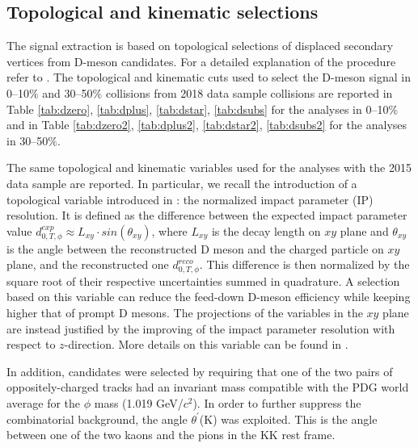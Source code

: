 \subsection{Topological and kinematic selections}
The signal extraction is based on topological selections of displaced secondary vertices from D-meson candidates. For a detailed explanation of the procedure refer to \cite{Adam:2015sza}. The topological and kinematic cuts used to select the D-meson signal in 0--10$\%$ and 30--50$\%$ collisions from 2018 data sample \pbpb collisions are reported in Table \ref{tab:dzero}, \ref{tab:dplus}, \ref{tab:dstar}, \ref{tab:dsubs} for the analyses in 0--10$\%$ and in Table \ref{tab:dzero2}, \ref{tab:dplus2}, \ref{tab:dstar2}, \ref{tab:dsubs2} for the analyses in 30--50$\%$.

The same topological and kinematic variables used for the analyses with the 2015 \pbpb data sample are reported. In particular, we recall the introduction of a topological variable introduced in \cite{Bruna:2016mgn} : the normalized impact parameter (IP) resolution. It is defined as the difference between the expected impact parameter value $d^{exp}_{0,T,\phi} \approx L_{xy} \cdot sin(\theta_{xy})$, where $L_{xy}$ is the decay length on $xy$ plane and $\theta_{xy}$ is the angle between the reconstructed D meson and the charged particle on $xy$ plane, and the reconstructed one $d^{reco}_{0,T,\phi}$. This difference is then normalized by the square root of their respective uncertainties summed in quadrature. A selection based on this variable can reduce the feed-down D-meson efficiency while keeping higher that of prompt D mesons. The projections of the variables in the $xy$ plane are instead justified by the improving of the impact parameter resolution with respect to $z$-direction. More details on this variable can be found in \cite{Bruna:2016mgn}.

In addition, \Dsubs candidates were selected by requiring that one of the two pairs of oppositely-charged tracks had an invariant mass compatible with the PDG world average for the $\phi$ mass (1.019 GeV/$c^2$). 
In order to further suppress the combinatorial background, the angle $\theta^{'}$(K) was exploited. This is the angle between one of the two kaons and the pions in the KK rest frame.




